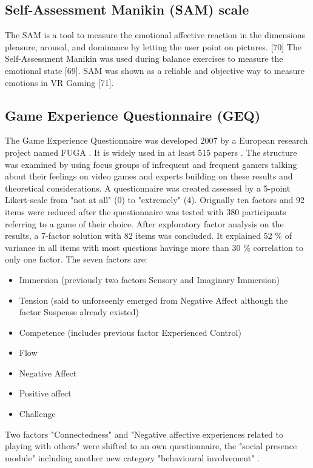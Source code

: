 \subsection{Self-Assessment Manikin (SAM) scale}
The SAM is a tool to measure the emotional affective reaction in the dimensions pleasure, arousal, and dominance by letting the user point on pictures. [70] The Self-Assessment Manikin was used during balance exercises to measure the emotional state [69]. SAM was shown as a reliable and objective way to measure emotions in VR Gaming [71].

\subsection{Game Experience Questionnaire (GEQ)}
The Game Experience Questionnaire was developed 2007 by a European research project named FUGA \cite{poels2007game}. It is widely used in at least 515 papers \cite{law2018systematic}. The structure was examined by using focus groups of infrequent and frequent gamers talking about their feelings on video games and experts building on these results and theoretical considerations. A questionnaire was created assessed by a 5-point Likert-scale from "not at all" (0) to "extremely" (4). Orignally ten factors and 92 items were reduced after the questionnaire was tested with 380 participants referring to a game of their choice. After exploratory factor analysis on the results, a 7-factor solution with 82 items was concluded. It explained 52 \% of variance in all items with most questions havinge more than 30 \% correlation to only one factor. The seven factors are:
\begin{itemize}[noitemsep]
	\item Immersion (previously two factors Sensory and Imaginary Immersion)
	\item Tension (said to unforseenly emerged from Negative Affect although the factor Suspense already existed)
	\item Competence (includes previous factor Experienced Control)
	\item Flow
	\item Negative Affect
	\item Positive affect
	\item Challenge
\end{itemize}
Two factors "Connectedness" and "Negative affective experiences related to playing with others" were shifted to an own questionnaire, the "social presence module" including another new category "behavioural involvement" .

